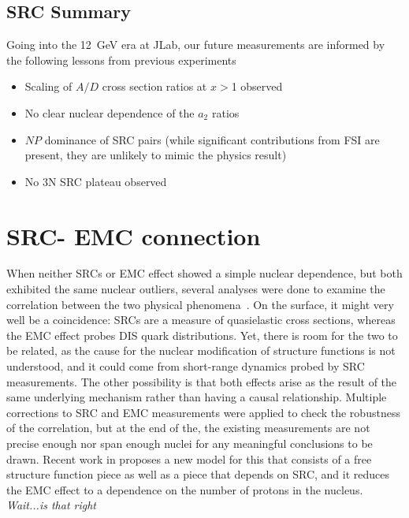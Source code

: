 \subsection{SRC Summary}
Going into the 12~GeV era at JLab, our future measurements are informed by the following lessons from previous experiments
\begin{itemize}
\item Scaling of $A/D$ cross section ratios at $x>$1 observed
\item No clear nuclear dependence of the $a_2$ ratios
\item $NP$ dominance of SRC pairs (while significant contributions from FSI are present, they are unlikely to mimic the physics result)
\item No 3N SRC plateau observed
\end{itemize}
\section{\label{sec:SRC_EMC}SRC- EMC connection}
When neither SRCs or EMC effect showed a simple nuclear dependence, but both exhibited the same nuclear outliers, several analyses were done to examine the correlation between the two physical phenomena~\cite{arrington12, Hen:2012fm, Weinstein:2010rt}.  On the surface, it might very well be a coincidence: SRCs are a measure of quasielastic cross sections, whereas the EMC effect probes DIS quark distributions.  Yet, there is room for the two to be related, as the cause for the nuclear modification of structure functions is not understood, and it could come from short-range dynamics probed by SRC measurements.   The other possibility is that both effects arise as the result of the same underlying mechanism rather than having a causal relationship.  Multiple corrections to SRC and EMC measurements were applied to check the robustness of the correlation, but at the end of the, the existing measurements are not precise enough nor span enough nuclei for any meaningful conclusions to be drawn.  Recent work in %
proposes a new model for this that consists of a free structure function piece as well as a piece that depends on SRC, and it  reduces the EMC effect to a dependence on the number of protons in the nucleus.  \textit{Wait...is that right}
